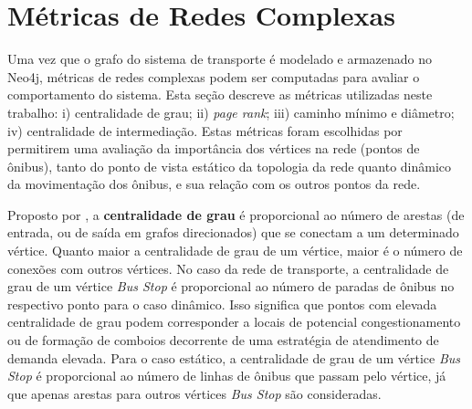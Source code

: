 



\section{Métricas de Redes Complexas} \label{sec:metr}

Uma vez que o grafo do sistema de transporte é modelado e armazenado no Neo4j, métricas de redes complexas podem ser computadas para avaliar o comportamento do sistema. Esta seção descreve as métricas utilizadas neste trabalho: i) centralidade de grau; ii) \emph{page rank}; iii) caminho mínimo e diâmetro; iv) centralidade de intermediação. Estas métricas foram escolhidas por permitirem uma avaliação da importância dos vértices na rede (pontos de ônibus), tanto do ponto de vista estático da topologia da rede quanto dinâmico da movimentação dos ônibus, e sua relação com os outros pontos da rede.

Proposto por \cite{free:79}, a {\bf centralidade de grau} é proporcional ao número de arestas (de entrada, ou de saída em grafos direcionados) que se conectam a um determinado vértice. Quanto maior a centralidade de grau de um vértice, maior é o número de conexões com outros vértices. No caso da rede de transporte, a centralidade de grau de um vértice \emph{Bus Stop} é proporcional ao número de paradas de ônibus no respectivo ponto para o caso dinâmico. Isso significa que pontos com elevada centralidade de grau podem corresponder a locais de potencial congestionamento ou de formação de comboios decorrente de uma estratégia de atendimento de demanda elevada. Para o caso estático, a centralidade de grau de um vértice \emph{Bus Stop} é proporcional ao número de linhas de ônibus que passam pelo vértice, já que apenas arestas para outros vértices \emph{Bus Stop} são consideradas.

